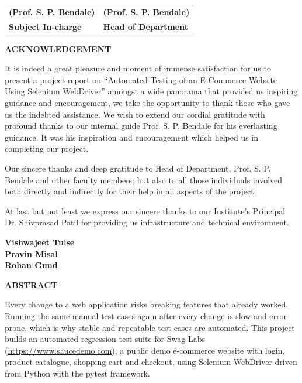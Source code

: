 \documentclass[12pt,a4paper]{article}
\newcommand{\ptitle}{Automated Testing of an E-Commerce Website Using Selenium WebDriver}
\begin{document}
\begin{tabular}{p{7cm}p{7cm}}
\textbf{(Prof. S. P. Bendale)} & \textbf{(Prof. S. P. Bendale)}\\[0.3cm]
\textbf{Subject In-charge} & \textbf{Head of Department}\\
\end{tabular}
\newpage

\begin{center}{\large\bfseries ACKNOWLEDGEMENT}\end{center}
\vspace{0.3cm}
It is indeed a great pleasure and moment of immense satisfaction for us to present a project report on ``\ptitle'' amongst a wide panorama that provided us inspiring guidance and encouragement, we take the opportunity to thank those who gave us the indebted assistance. We wish to extend our cordial gratitude with profound thanks to our internal guide Prof. S. P. Bendale for his everlasting guidance. It was his inspiration and encouragement which helped us in completing our project.

Our sincere thanks and deep gratitude to Head of Department, Prof. S. P. Bendale and other faculty members; but also to all those individuals involved both directly and indirectly for their help in all aspects of the project.

At last but not least we express our sincere thanks to our Institute's Principal Dr. Shivprasad Patil for providing us infrastructure and technical environment.
\vspace{1.5cm}

\begin{flushright}
\textbf{Vishwajeet Tulse}\\
\textbf{Pravin Misal}\\
\textbf{Rohan Gund}
\end{flushright}
\newpage

\begin{center}{\large\bfseries ABSTRACT}\end{center}
Every change to a web application risks breaking features that already worked. Running the same manual test cases again after every change is slow and error-prone, which is why stable and repeatable test cases are automated. This project builds an automated regression test suite for Swag Labs (\url{https://www.saucedemo.com}), a public demo e-commerce website with login, product catalogue, shopping cart and checkout, using Selenium WebDriver driven from Python with the pytest framework.
\end{document}
